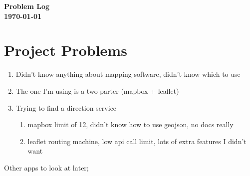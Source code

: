 \documentclass[a4paper,twoside,notitlepage,11pt]{article}
\begin{document}
\pagestyle{empty}
\begin{center}
 {\LARGE \textbf{Problem Log} \\ [0.2cm]}
	 \textbf{\today}
\end{center}

\section{Project Problems}
\begin{enumerate}
\item Didn't know anything about mapping software, didn't know which to use
\item The one I'm using is a two parter (mapbox + leaflet)
\item Trying to find a direction service
	\begin{enumerate}
	\item mapbox limit of 12, didn't know how to use geojson, no docs really
	\item leaflet routing machine, low api call limit, lots of extra features I didn't want
	\end{enumerate}
\end{enumerate}


{\color{red} 
Other apps to look at later;\ \\
\ \\
}
\end{document}
